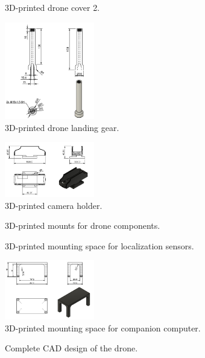 \begin{figure}[H]
    \centering
    \caption{3D-printed drone cover 2.}
    \label{fig:drone_cover_2}
\end{figure}

\begin{figure}[H]
    \centering
    \includegraphics[width=0.35\textwidth]{PLANOS/PLANO_DRONE_PATA.png}
    \caption{3D-printed drone landing gear.}
    \label{fig:landing_gear}
\end{figure}

\begin{figure}[H]
    \centering
    \includegraphics[width=0.35\textwidth]{PLANOS/camera_holder.jpeg}
    \caption{3D-printed camera holder.}
    \label{fig:camera_holder}
\end{figure}

\begin{figure}[H]
    \centering
    \caption{3D-printed mounts for drone components.}
    \label{fig:drone_mounts}
\end{figure}

\begin{figure}[H]
    \centering
    \caption{3D-printed mounting space for localization sensors.}
    \label{fig:localization_mount}
\end{figure}

\begin{figure}[H]
    \centering
    \includegraphics[width=0.35\textwidth]{PLANOS/rpi_mount.jpeg}
    \caption{3D-printed mounting space for companion computer.}
    \label{fig:rpi_mount}
\end{figure}

\begin{figure}[H]
    \centering
    \caption{Complete CAD design of the drone.}
    \label{fig:drone_cad}
\end{figure}